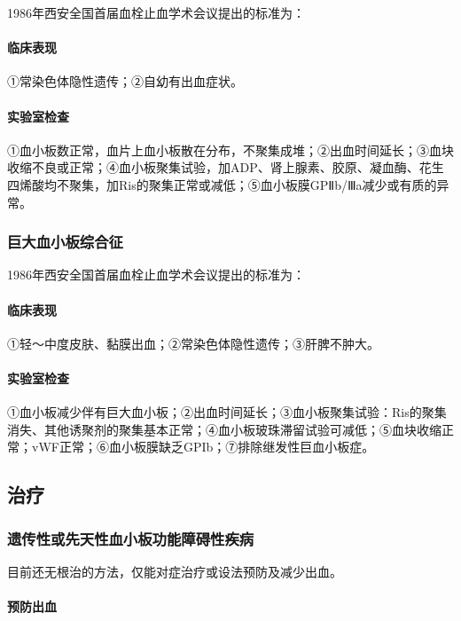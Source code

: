 1986年西安全国首届血栓止血学术会议提出的标准为：

\paragraph{临床表现}

①常染色体隐性遗传；②自幼有出血症状。

\paragraph{实验室检查}

①血小板数正常，血片上血小板散在分布，不聚集成堆；②出血时间延长；③血块收缩不良或正常；④血小板聚集试验，加ADP、肾上腺素、胶原、凝血酶、花生四烯酸均不聚集，加Ris的聚集正常或减低；⑤血小板膜GPⅡb/Ⅲa减少或有质的异常。

\subsubsection{巨大血小板综合征}

1986年西安全国首届血栓止血学术会议提出的标准为：

\paragraph{临床表现}

①轻～中度皮肤、黏膜出血；②常染色体隐性遗传；③肝脾不肿大。

\paragraph{实验室检查}

①血小板减少伴有巨大血小板；②出血时间延长；③血小板聚集试验：Ris的聚集消失、其他诱聚剂的聚集基本正常；④血小板玻珠滞留试验可减低；⑤血块收缩正常；vWF正常；⑥血小板膜缺乏GPIb；⑦排除继发性巨血小板症。

\subsection{治疗}

\subsubsection{遗传性或先天性血小板功能障碍性疾病}

目前还无根治的方法，仅能对症治疗或设法预防及减少出血。

\paragraph{预防出血}

